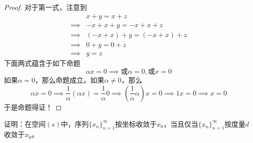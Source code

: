 \documentclass[lang = cn, scheme = chinese, 10pt]{elegantbook}
\begin{document}
\begin{proof}
	对于第一式，注意到
	\nonumber\begin{align}
		&x+y=x+z\\
		\implies & -x+x+y=-x+x+z \\
		\implies & (-x+x)+y=(-x+x)+z \\
		\implies & 0+y=0+z \\
		\implies & y=z
	\end{align}
	下面两式蕴含于如下命题
	$$
	\alpha x=0\implies 或\alpha=0,或x=0
	$$
	如果$\alpha=0$，那么命题成立。如果$\alpha\ne0$，那么
	$$
	\alpha x=0\implies  \frac{1}{\alpha}(\alpha x)=\frac{1}{\alpha}0\implies (\frac{1}{\alpha}\alpha) x=0 \implies 1x=0\implies x=0
	$$
	于是命题得证！
\end{proof}

\begin{proposition}
	证明：在空间$(s)$中，序列$\{x_n\}_{n=1}^{\infty}$按坐标收敛于$x_0$，当且仅当$\{x_n\}_{n=1}^{\infty}$按度量$d$收敛于$x_0$。
\end{proposition}
\end{document}
